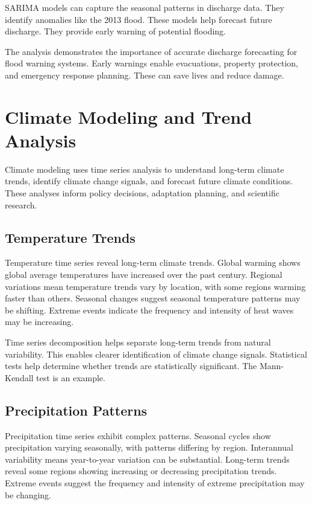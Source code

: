SARIMA models can capture the seasonal patterns in discharge data. They identify anomalies like the 2013 flood. These models help forecast future discharge. They provide early warning of potential flooding.

The analysis demonstrates the importance of accurate discharge forecasting for flood warning systems. Early warnings enable evacuations, property protection, and emergency response planning. These can save lives and reduce damage.

\section{Climate Modeling and Trend Analysis}

Climate modeling uses time series analysis to understand long-term climate trends, identify climate change signals, and forecast future climate conditions. These analyses inform policy decisions, adaptation planning, and scientific research.

\subsection{Temperature Trends}

Temperature time series reveal long-term climate trends. Global warming shows global average temperatures have increased over the past century. Regional variations mean temperature trends vary by location, with some regions warming faster than others. Seasonal changes suggest seasonal temperature patterns may be shifting. Extreme events indicate the frequency and intensity of heat waves may be increasing.

Time series decomposition helps separate long-term trends from natural variability. This enables clearer identification of climate change signals. Statistical tests help determine whether trends are statistically significant. The Mann-Kendall test is an example.

\subsection{Precipitation Patterns}

Precipitation time series exhibit complex patterns. Seasonal cycles show precipitation varying seasonally, with patterns differing by region. Interannual variability means year-to-year variation can be substantial. Long-term trends reveal some regions showing increasing or decreasing precipitation trends. Extreme events suggest the frequency and intensity of extreme precipitation may be changing.

